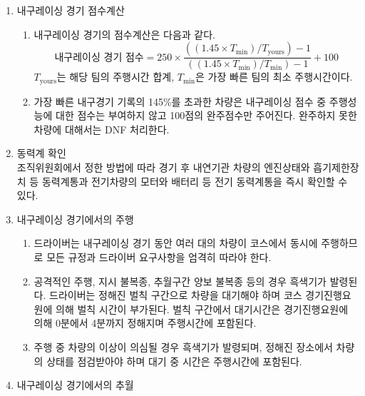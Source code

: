 \documentclass[final,a4paper,10pt]{report}
\begin{document}
{\begin{enumerate}
\begin{enumerate}
    \end{enumerate}
  \item\label{rule:formula-competition.endurance.scoring} 내구레이싱 경기 점수계산
    \begin{enumerate}
      \item\label{rule:formula-competition.endurance.scoring.score-formula} 내구레이싱 경기의 점수계산은 다음과 같다.
        \[
          \text{내구레이싱 경기 점수} = 250 \times
          \frac{((1.45 \times T_{\min}) / T_{\mathrm{yours}}) - 1}
               {((1.45 \times T_{\min}) / T_{\min}) - 1} + 100
        \]
        $T_{\mathrm{yours}}$는 해당 팀의 주행시간 합계, $T_{\min}$은 가장 빠른 팀의 최소 주행시간이다.
      \item\label{rule:formula-competition.endurance.scoring.over-145pct-finish-only} 가장 빠른 내구경기 기록의 145\%를 초과한 차량은 내구레이싱 점수 중 주행성능에 대한 점수는 부여하지 않고 100점의 완주점수만 주어진다. 완주하지 못한 차량에 대해서는 DNF 처리한다.
    \end{enumerate}
  \item\label{rule:formula-competition.endurance.post-race-powertrain-check} 동력계 확인\\
    조직위원회에서 정한 방법에 따라 경기 후 내연기관 차량의 엔진상태와 흡기제한장치 등 동력계통과 전기차량의 모터와 배터리 등 전기 동력계통을 즉시 확인할 수 있다.
  \item\label{rule:formula-competition.endurance.driving-conduct} 내구레이싱 경기에서의 주행
    \begin{enumerate}
      \item\label{rule:formula-competition.endurance.driving-conduct.strict-compliance-multi-car} 드라이버는 내구레이싱 경기 동안 여러 대의 차량이 코스에서 동시에 주행하므로 모든 규정과 드라이버 요구사항을 엄격히 따라야 한다.
      \item\label{rule:formula-competition.endurance.driving-conduct.black-flag-penalty-wait} 공격적인 주행, 지시 불복종, 추월구간 양보 불복종 등의 경우 흑색기가 발령된다. 드라이버는 정해진 벌칙 구간으로 차량을 대기해야 하며 코스 경기진행요원에 의해 벌칙 시간이 부가된다. 벌칙 구간에서 대기시간은 경기진행요원에 의해 0분에서 4분까지 정해지며 주행시간에 포함된다.
      \item\label{rule:formula-competition.endurance.driving-conduct.suspected-fault-check} 주행 중 차량의 이상이 의심될 경우 흑색기가 발령되며, 정해진 장소에서 차량의 상태를 점검받아야 하며 대기 중 시간은 주행시간에 포함된다.
    \end{enumerate}
  \item\label{rule:formula-competition.endurance.overtaking} 내구레이싱 경기에서의 추월

\end{enumerate}}
\end{document}
